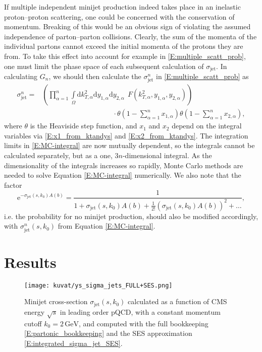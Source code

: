 \documentclass[a4paper, twoside, english, 12pt]{report}
\begin{document}
If multiple independent minijet production indeed takes place in an inelastic proton--proton scattering, one could be concerned with the conservation of momentum. Breaking of this would be an obvious sign of violating the assumed independence of parton--parton collisions. Clearly, the sum of the momenta of the individual partons cannot exceed the initial momenta of the protons they are from. To take this effect into account for example in \eqref{E:multiple_scatt_prob}, one must limit the phase space of each subsequent calculation of $\sigma_\text{jet}$. In calculating $G_n$, we should then calculate the $\sigma_\text{jet}^n$ in \eqref{E:multiple_scatt_prob} as
\begin{align}\label{E:MC-integral}
\sigma_\text{jet}^n = &\left(\prod\limits_{\alpha=1}^{n} \int\limits_{\Omega} \textstyle\text{d}k_{T,\alpha}^2\text{d}y_{1,\alpha}\text{d}y_{2,\alpha} \displaystyle\:\:  F\left(k_{T,\alpha}^2,y_{1,\alpha},y_{2,\alpha}\right)\right)\nonumber\\[0.6em]
&\qquad\qquad\qquad\qquad\qquad\cdot\theta\left(1-\sum\limits_{\alpha=1}^{n}x_{1,\alpha}\right)\theta\left(1-\sum\limits_{\alpha=1}^{n}x_{2,\alpha}\right),
\end{align}
where $\theta$ is the Heaviside step function, and $x_1$ and $x_2$ depend on the integral variables via \eqref{E:x1_from_ktandys} and \eqref{E:x2_from_ktandys}. The integration limits in \eqref{E:MC-integral} are now mutually dependent, so the integrals cannot be calculated separately, but as a one, $3n$-dimensional integral. As the dimensionality of the integrals increases so rapidly, Monte Carlo methods are needed to solve Equation \eqref{E:MC-integral} numerically. We also note that the factor 
\begin{equation*}
	\text{e}^{-\sigma_\text{jet}(s, k_0)A(b)} = \frac{1}{1+\sigma_\text{jet}(s, k_0)A(b) +\frac{1}{2!}(\sigma_\text{jet}(s, k_0)A(b))^2 + \ldots},
\end{equation*}
i.e. the probability for no minijet production, should also be modified accordingly, with $\sigma_\text{jet}^n(s, k_0)$ from Equation \eqref{E:MC-integral}.





\cleardoublepage
\chapter{Results}

\begin{figure}[b!]
	\centering
	\texttt{[image: kuvat/ys\_sigma\_jets\_FULL+SES.png]}
	\caption{Minijet cross-section $\sigma_{\text{jet}}(s, k_0)$ calculated as a function of CMS energy $\sqrt{s}$ in leading order pQCD, with a constant momentum cutoff $k_0 = 2\,\text{GeV}$, and computed with the full bookkeeping \eqref{E:partonic_bookkeeping} and the SES approximation \eqref{E:integrated_sigma_jet_SES}.}
	\label{F:FULL_vs_SES_const_kt0}
\end{figure}
\end{document}
